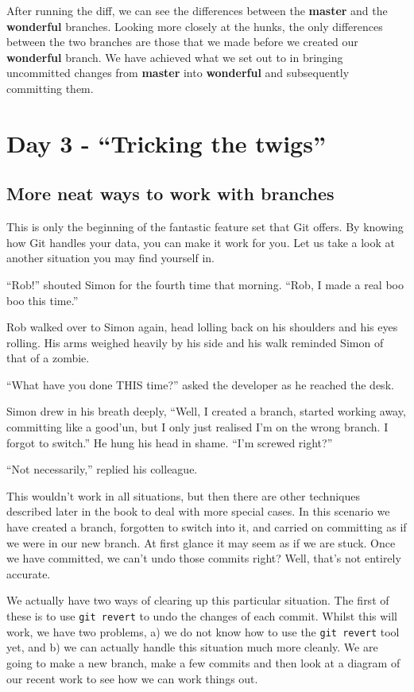After running the diff, we can see the differences between the \textbf{master} and the \textbf{wonderful} branches.  Looking more closely at the hunks, the only differences between the two branches are those that we made before we created our \textbf{wonderful} branch.  We have achieved what we set out to in bringing uncommitted changes from \textbf{master} into \textbf{wonderful} and subsequently committing them.

\section{Day 3 - ``Tricking the twigs''}
\subsection{More neat ways to work with branches}

This is only the beginning of the fantastic feature set that Git offers.  By knowing how Git handles your data, you can make it work for you.  Let us take a look at another situation you may find yourself in.

\begin{trenches}
``Rob!'' shouted Simon for the fourth time that morning.  ``Rob, I made a real boo boo this time.''

Rob walked over to Simon again, head lolling back on his shoulders and his eyes rolling.  His arms weighed heavily by his side and his walk reminded Simon of that of a zombie.

``What have you done THIS time?'' asked the developer as he reached the desk.

Simon drew in his breath deeply, ``Well, I created a branch, started working away, committing like a good'un, but I only just realised I'm on the wrong branch.  I forgot to switch.''  He hung his head in shame.  ``I'm screwed right?''

``Not necessarily,'' replied his colleague.
\end{trenches}

This wouldn't work in all situations, but then there are other techniques described later in the book to deal with more special cases.  In this scenario we have created a branch, forgotten to switch into it, and carried on committing as if we were in our new branch.  At first glance it may seem as if we are stuck.  Once we have committed, we can't undo those commits right?  Well, that's not entirely accurate.  

We actually have two ways of clearing up this particular situation.  The first of these is to use \texttt{git revert} to undo the changes of each commit.  Whilst this will work, we have two problems, a) we do not know how to use the \texttt{git revert} tool yet, and b) we can actually handle this situation much more cleanly.  We are going to make a new branch, make a few commits and then look at a diagram of our recent work to see how we can work things out.

